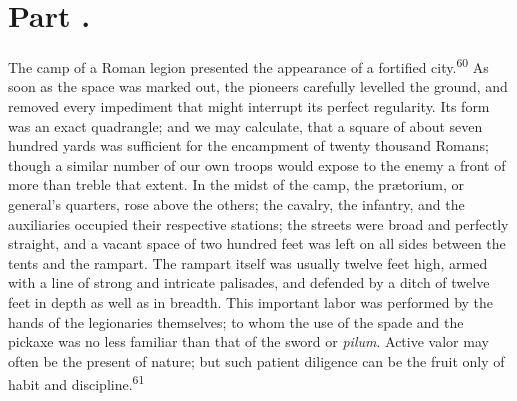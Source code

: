 
\section{Part \thesection.}

The camp of a Roman legion presented the appearance of a
fortified city.\textsuperscript{60} As soon as the space was marked out, the
pioneers carefully levelled the ground, and removed every
impediment that might interrupt its perfect regularity. Its form
was an exact quadrangle; and we may calculate, that a square of
about seven hundred yards was sufficient for the encampment of
twenty thousand Romans; though a similar number of our own troops
would expose to the enemy a front of more than treble that
extent. In the midst of the camp, the prætorium, or general’s
quarters, rose above the others; the cavalry, the infantry, and
the auxiliaries occupied their respective stations; the streets
were broad and perfectly straight, and a vacant space of two
hundred feet was left on all sides between the tents and the
rampart. The rampart itself was usually twelve feet high, armed
with a line of strong and intricate palisades, and defended by a
ditch of twelve feet in depth as well as in breadth. This
important labor was performed by the hands of the legionaries
themselves; to whom the use of the spade and the pickaxe was no
less familiar than that of the sword or \textit{pilum}. Active valor may
often be the present of nature; but such patient diligence can be
the fruit only of habit and discipline.\textsuperscript{61}



